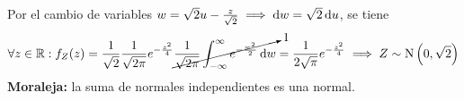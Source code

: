 \begin{ejem}
	Por el cambio de variables $w = \sqrt{2} u - \frac{z}{\sqrt{2}} \implies \odif{w} = \sqrt{2} \odif{u} $, se tiene
	\[\forall z \in \R : f_Z(z) = \frac{1}{\sqrt{2}} \frac{1}{\sqrt{2\pi}} e^{-\frac{z^2}{4}} \cancelto{1}{\frac{1}{\sqrt{2\pi}} \int_{-\infty}^{\infty} e^{-\frac{w^2}{2}} \odif{w}} = \frac{1}{2\sqrt{\pi}} e^{-\frac{z^2}{4}} \implies Z \sim \normal{0, \sqrt{2}}\]
	\textbf{Moraleja:} la suma de normales independientes es una normal.
\end{ejem}

